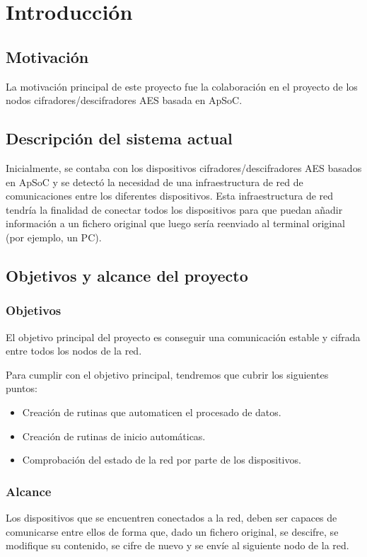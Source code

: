 \chapter{Introducción}
\section{Motivación}
La motivación principal de este proyecto fue la colaboración en el proyecto de los nodos cifradores/descifradores AES basada en ApSoC.

\section{Descripción del sistema actual}
Inicialmente, se contaba con los dispositivos cifradores/descifradores AES basados en ApSoC y se detectó la necesidad de una infraestructura de red de comunicaciones entre los diferentes dispositivos. Esta infraestructura de red tendría la finalidad de conectar todos los dispositivos para que puedan añadir información a un fichero original que luego sería reenviado al terminal original (por ejemplo, un PC).

\section{Objetivos y alcance del proyecto}
\subsection{Objetivos}
El objetivo principal del proyecto es conseguir una comunicación estable y cifrada entre todos los nodos de la red.

Para cumplir con el objetivo principal, tendremos que cubrir los siguientes puntos:
\begin{itemize}
	\item Creación de rutinas que automaticen el procesado de datos.
	\item Creación de rutinas de inicio automáticas.
	\item Comprobación del estado de la red por parte de los dispositivos.
\end{itemize}

\subsection{Alcance}
Los dispositivos que se encuentren conectados a la red, deben ser capaces de comunicarse entre ellos de forma que, dado un fichero original, se descifre, se modifique su contenido, se cifre de nuevo y se envíe al siguiente nodo de la red.

